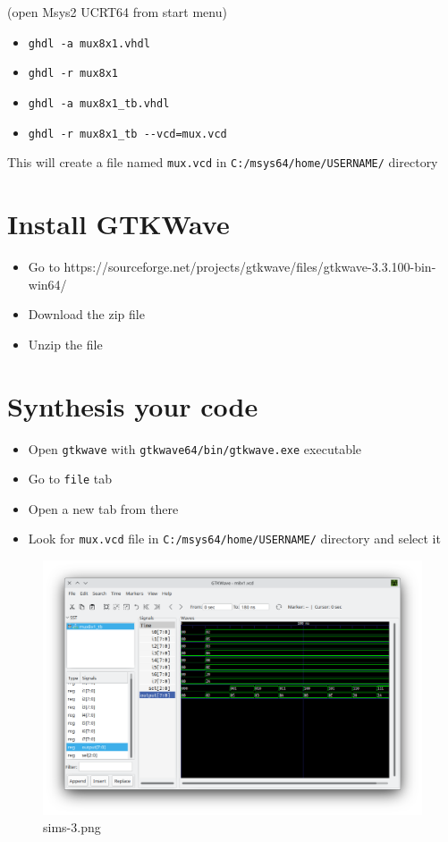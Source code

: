 \documentclass[11pt]{article}
\providecommand{\tightlist}{%
      \setlength{\itemsep}{0pt}\setlength{\parskip}{0pt}}
\begin{document}
(open Msys2 UCRT64 from start menu)

\begin{itemize}
\tightlist
\item
  \texttt{ghdl\ -a\ mux8x1.vhdl}
\item
  \texttt{ghdl\ -r\ mux8x1}
\item
  \texttt{ghdl\ -a\ mux8x1\_tb.vhdl}
\item
  \texttt{ghdl\ -r\ mux8x1\_tb\ -\/-vcd=mux.vcd}
\end{itemize}

This will create a file named \texttt{mux.vcd} in
\texttt{C:/msys64/home/USERNAME/} directory

    \hypertarget{install-gtkwave}{%
\section{Install GTKWave}\label{install-gtkwave}}

\begin{itemize}
\tightlist
\item
  Go to
  https://sourceforge.net/projects/gtkwave/files/gtkwave-3.3.100-bin-win64/
\item
  Download the zip file
\item
  Unzip the file
\end{itemize}

    \hypertarget{synthesis-your-code}{%
\section{Synthesis your code}\label{synthesis-your-code}}

\begin{itemize}
\tightlist
\item
  Open \texttt{gtkwave} with \texttt{gtkwave64/bin/gtkwave.exe}
  executable
\item
  Go to \texttt{file} tab
\item
  Open a new tab from there
\item
  Look for \texttt{mux.vcd} file in \texttt{C:/msys64/home/USERNAME/}
  directory and select it
\end{itemize}

    \begin{figure}
\centering
\includegraphics{sims-3.png}
\caption{sims-3.png}
\end{figure}
\end{document}
